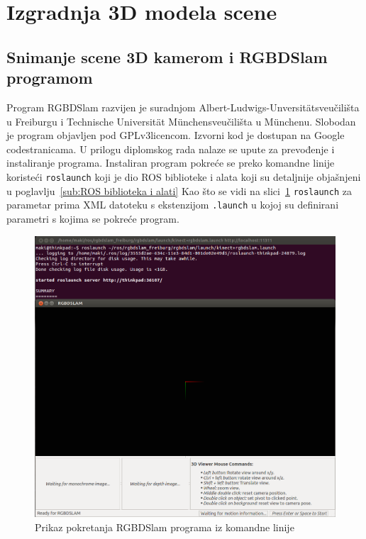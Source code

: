 \newpage
\setcounter{figure}{0}

\section{Izgradnja 3D modela scene} %
\label{sec:Izgradnja 3D modela scene}

\subsection{Snimanje scene 3D kamerom i RGBDSlam programom} %
\label{sub:Snimanje scene 3D kamerom i RGBDSlam programom}
Program RGBDSlam razvijen je suradnjom
Albert-Ludwigs-Unversität\footnotemark[1] sveučilišta u Freiburgu i
Technische Universität München\footnotemark[2] sveučilišta u Münchenu.
Slobodan je program objavljen pod GPLv3\footnotemark[3] licencom.
Izvorni kod je dostupan na Google code\footnotemark[4] stranicama. U
prilogu diplomskog rada nalaze se upute za prevođenje i instaliranje
programa. Instaliran program pokreće se preko komandne linije koristeći
\texttt{roslaunch} koji je dio ROS biblioteke i alata
koji su detaljnije objašnjeni u poglavlju~\ref{sub:ROS biblioteka i
alati} Kao što se vidi na slici~\ref{fig:running-rgbdslam}
\texttt{roslaunch} za parametar prima XML datoteku s ekstenzijom
\texttt{.launch} u kojoj su definirani parametri s kojima se pokreće
program.

\begin{figure}[h]
\centering
\includegraphics[scale=0.39]{figures/running-rgbdslam.png}
\caption{Prikaz pokretanja RGBDSlam programa iz komandne linije}
\label{fig:running-rgbdslam}
\end{figure}

